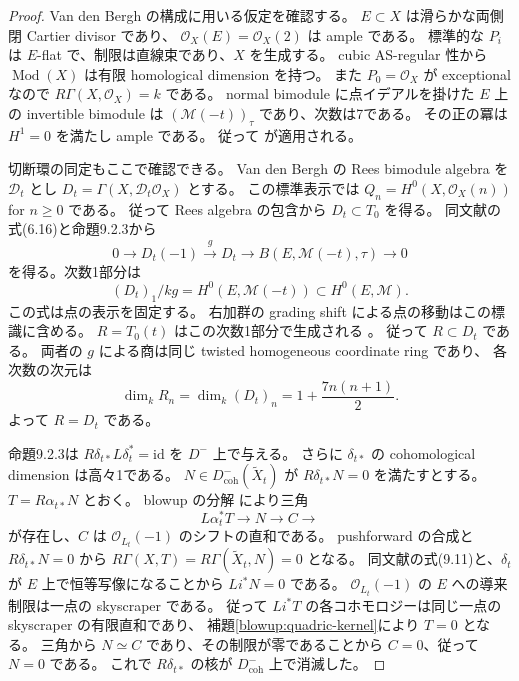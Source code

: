 \begin{proof}
Van den Bergh の構成に用いる仮定を確認する。
$E\subset X$ は滑らかな両側閉 Cartier divisor であり、
$\mathcal O_X(E)=\mathcal O_X(2)$ は ample である。
標準的な $P_i$ は $E$-flat で、制限は直線束であり、$X$ を生成する。
cubic AS-regular 性から $\operatorname{Mod}(X)$ は有限 homological dimension を持つ。
また $P_0=\mathcal O_X$ が exceptional なので
$R\Gamma(X,\mathcal O_X)=k$ である。
normal bimodule に点イデアルを掛けた $E$ 上の invertible bimodule は
$(\mathcal M(-t))_\tau$ であり、次数は7である。
その正の冪は $H^1=0$ を満たし ample である。
従って \cite[\S9.2、命題9.2.2、命題9.2.3]{BlowupVdB2001} が適用される。

切断環の同定もここで確認できる。
Van den Bergh の Rees bimodule algebra を $\mathcal D_t$ とし
$D_t=\Gamma(X,\mathcal D_t\mathcal O_X)$ とする。
この標準表示では
$Q_n=H^0(X,\mathcal O_X(n))$ for $n\ge0$ である。
従って Rees algebra の包含から $D_t\subset T_0$ を得る。
同文献の式(6.16)と命題9.2.3から
\[
 0\longrightarrow D_t(-1)\xrightarrow{g}D_t
 \longrightarrow B(E,\mathcal M(-t),\tau)\longrightarrow0
\]
を得る。次数1部分は
\[
 (D_t)_1/k g=H^0(E,\mathcal M(-t))\subset H^0(E,\mathcal M).
\]
この式は点の表示を固定する。
右加群の grading shift による点の移動はこの標識に含める。
$R=T_0(t)$ はこの次数1部分で生成される
\cite[定理5.3]{BlowupRSS2015}。
従って $R\subset D_t$ である。
両者の $g$ による商は同じ twisted homogeneous coordinate ring であり、
各次数の次元は
\[
 \dim_k R_n=\dim_k(D_t)_n=1+\frac{7n(n+1)}2.
\]
よって $R=D_t$ である。

命題9.2.3は $R\delta_{t*}L\delta_t^*=\mathrm{id}$ を $D^-$ 上で与える。
さらに $\delta_{t*}$ の cohomological dimension は高々1である。
$N\in D^-_{\mathrm{coh}}(\widetilde X_t)$ が $R\delta_{t*}N=0$ を満たすとする。
$T=R\alpha_{t*}N$ とおく。
blowup の分解 \cite[定理8.4.1]{BlowupVdB2001} により三角
\[
 L\alpha_t^*T\longrightarrow N\longrightarrow C\longrightarrow
\]
が存在し、$C$ は $\mathcal O_{L_t}(-1)$ のシフトの直和である。
pushforward の合成と $R\delta_{t*}N=0$ から
$R\Gamma(X,T)=R\Gamma(\widetilde X_t,N)=0$ となる。
同文献の式(9.11)と、$\delta_t$ が $E$ 上で恒等写像になることから
$Li^*N=0$ である。
$\mathcal O_{L_t}(-1)$ の $E$ への導来制限は一点の skyscraper である。
従って $Li^*T$ の各コホモロジーは同じ一点の skyscraper の有限直和であり、
補題\ref{blowup:quadric-kernel}により $T=0$ となる。
三角から $N\simeq C$ であり、その制限が零であることから $C=0$、従って $N=0$ である。
これで $R\delta_{t*}$ の核が $D^-_{\mathrm{coh}}$ 上で消滅した。


\end{proof}
